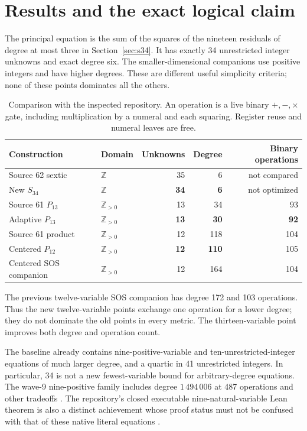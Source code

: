 \documentclass[11pt,a4paper]{article}
\theoremstyle{definition}
\newcommand{\Z}{\mathbb Z}
\newcommand{\Zp}{\mathbb Z_{>0}}
\begin{document}
\section{Results and the exact logical claim}
\label{sec:results}

The principal equation is the sum of the squares of the nineteen
residuals of degree at most three in Section~\ref{sec:s34}. It has exactly 34 unrestricted
integer unknowns and exact degree six. The smaller-dimensional
companions use positive integers and have higher degrees. These
are different useful simplicity criteria; none of these points
dominates all the others.

\begin{table}[htbp]
\centering\small
\begin{tabular}{@{}llrrr@{}}
\toprule
Construction & Domain & Unknowns & Degree & Binary operations\\
\midrule
Source 62 sextic & \(\Z\)&35&6&not compared\\
New \(S_{34}\)&\(\Z\)&\textbf{34}&\textbf{6}&not optimized\\
\addlinespace
Source 61 \(P_{13}\)&\(\Zp\)&13&34&93\\
Adaptive \(P_{13}\)&\(\Zp\)&\textbf{13}&\textbf{30}&\textbf{92}\\
\addlinespace
Source 61 product&\(\Zp\)&12&118&104\\
Centered \(P_{12}\)&\(\Zp\)&\textbf{12}&\textbf{110}&105\\
Centered SOS companion&\(\Zp\)&12&164&104\\
\bottomrule
\end{tabular}
\caption{Comparison with the inspected repository. An operation is
a live binary \(+,-,\times\) gate, including multiplication by a
numeral and each squaring. Register reuse and numeral leaves are free.}
\label{tab:results}
\end{table}

The previous twelve-variable SOS companion has degree 172 and
103 operations. Thus the new twelve-variable points exchange
one operation for a lower degree; they do not dominate the old
points in every metric. The thirteen-variable point improves
both degree and operation count.

The baseline already contains nine-positive-variable and
ten-unrestricted-integer equations of much larger degree, and a
quartic in 41 unrestricted integers. In particular, 34 is not a
new fewest-variable bound for arbitrary-degree equations.
The wave-9 nine-positive family includes degree \(1\,494\,006\)
at 487 operations and other tradeoffs \cite{wave67,wave66}.
The repository's closed executable nine-natural-variable Lean
theorem is also a distinct achievement whose proof status must
not be confused with that of these native literal equations
\cite{status}.
\end{document}
